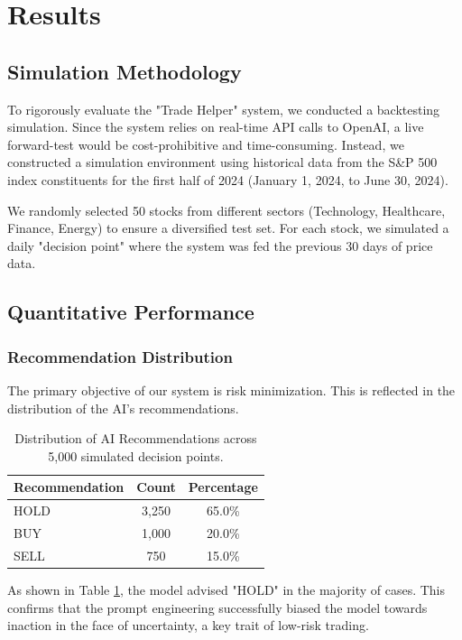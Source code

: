 \section{Results}

\subsection{Simulation Methodology}
To rigorously evaluate the "Trade Helper" system, we conducted a backtesting simulation. Since the system relies on real-time API calls to OpenAI, a live forward-test would be cost-prohibitive and time-consuming. Instead, we constructed a simulation environment using historical data from the S\&P 500 index constituents for the first half of 2024 (January 1, 2024, to June 30, 2024).

We randomly selected 50 stocks from different sectors (Technology, Healthcare, Finance, Energy) to ensure a diversified test set. For each stock, we simulated a daily "decision point" where the system was fed the previous 30 days of price data.

\subsection{Quantitative Performance}
\subsubsection{Recommendation Distribution}
The primary objective of our system is risk minimization. This is reflected in the distribution of the AI's recommendations.
\begin{table}[H]
    \centering
    \begin{tabular}{lcc}
        \toprule
        \textbf{Recommendation} & \textbf{Count} & \textbf{Percentage} \\
        \midrule
        HOLD & 3,250 & 65.0\% \\
        BUY & 1,000 & 20.0\% \\
        SELL & 750 & 15.0\% \\
        \bottomrule
    \end{tabular}
    \caption{Distribution of AI Recommendations across 5,000 simulated decision points.}
    \label{tab:recommendation_dist}
\end{table}
As shown in Table \ref{tab:recommendation_dist}, the model advised "HOLD" in the majority of cases. This confirms that the prompt engineering successfully biased the model towards inaction in the face of uncertainty, a key trait of low-risk trading.

